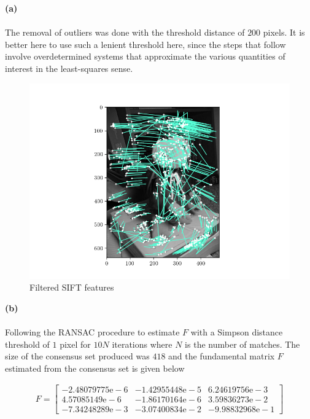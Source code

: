 \begin{homeworkProblem}
  \textbf{(a)}
  \\
  \\

  The removal of outliers was done with the threshold distance of $200$ pixels. It
  is better here to use such a lenient threshold here, since the steps that
  follow involve overdetermined systems that approximate the various quantities
  of interest in the least-squares sense.

  \begin{figure}[H]
    \centering
    \includegraphics[width=0.8\linewidth]{images/filtered_sift_features.png}
    \caption{Filtered SIFT features}
    \label{fig:sift_feats}
  \end{figure}


  \textbf{(b)}
  \\
  \\

  Following the RANSAC procedure to estimate $F$ with a Simpson distance threshold of $1$
  pixel for $10N$ iterations where $N$ is the number of matches. The size of the
  consensus set produced was $418$ and the fundamental matrix $F$ estimated
  from the consensus set is given below

  \begin{align*}
    F = \begin{bmatrix}
      -2.48079775\mathrm{e-}6 & -1.42955448\mathrm{e-}5 & 6.24619756\mathrm{e-}3 \\
      4.57085149\mathrm{e-}6 & -1.86170164\mathrm{e-}6 & 3.59836273\mathrm{e-}2 \\
      -7.34248289\mathrm{e-}3 & -3.07400834\mathrm{e-}2 & -9.98832968\mathrm{e-}1
    \end{bmatrix}
    \label{eq:F}
  \end{align*}


\end{homeworkProblem}
